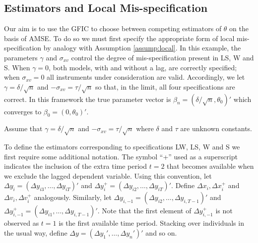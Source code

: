 \subsection{Estimators and Local Mis-specification}

Our aim is to use the GFIC to choose between competing estimators of $\theta$ on the basis of AMSE. 
To do so we must first specify the appropriate form of local mis-specification by analogy with Assumption \ref{assump:local}.
In this example, the parameters $\gamma$ and $\sigma_{xv}$ control the degree of mis-specification present in LS, W and S. 
When $\gamma=0$, both models, with and without a lag, are correctly specified; when $\sigma_{xv}=0$ all instruments under consideration are valid. 
Accordingly, we let $\gamma = \delta/\sqrt{n}$ and $-\sigma_{xv} = \tau/\sqrt{n}$ so that, in the limit, all four specifications are correct. 
In this framework the true parameter vector is $\beta_n = \left(\delta/\sqrt{n}, \theta_0\right)'$ which converges to $\beta_0 = \left(0,\theta_0\right)'$. 

\begin{assump}
\label{assump:localex}
Assume that $\gamma = \delta/\sqrt{n}$ and $-\sigma_{xv} = \tau/\sqrt{n}$ where $\delta$ and $\tau$ are unknown constants.
\end{assump}

To define the estimators corresponding to specifications LW, LS, W and S we first require some additional notation. The symbol ``+'' used as a superscript indicates the inclusion of the extra time period $t=2$ that becomes available when we exclude the lagged dependent variable.
Using this convention, let $\Delta y_i = \left( \Delta y_{i3}, \hdots, \Delta y_{iT} \right)'$ and  $\Delta y_i^+ = \left( \Delta y_{i2},  \hdots, \Delta y_{iT} \right)'$.
Define $\Delta x_i, \Delta x_i^+$ and $\Delta v_i, \Delta v_i^+$ analogously. 
Similarly, let $\Delta y_{i,-1}=\left(\Delta y_{i2}, \hdots, \Delta y_{i,T-1}\right)'$ and $\Delta y_{i,-1}^+=\left(\Delta y_{i1}, \hdots, \Delta y_{i,T-1}\right)'$.
Note that the first element of $\Delta y_{i,-1}^+$ is not observed as $t=1$ is the first available time period. 
Stacking over individuals in the usual way, define $\Delta y = \left( \Delta y_1', \hdots, \Delta y_n'\right)'$  and so on.

